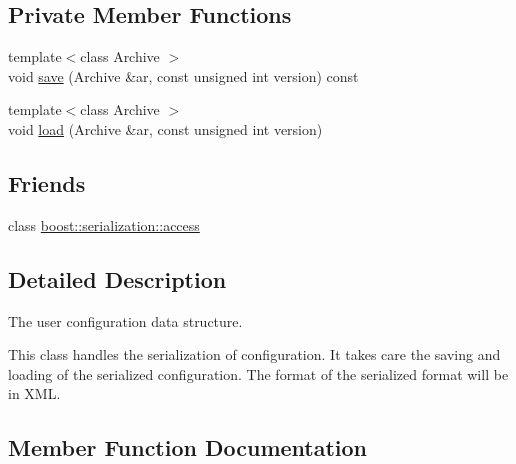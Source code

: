 \subsection*{Private Member Functions}
\begin{DoxyCompactItemize}
\item 
{\footnotesize template$<$class Archive $>$ }\\void \hyperlink{class_do_lah_1_1_configuration_a7d9dff9a6b5162f5fabf5bb657962b13}{save} (Archive \&ar, const unsigned int version) const 
\item 
{\footnotesize template$<$class Archive $>$ }\\void \hyperlink{class_do_lah_1_1_configuration_adeb5727cd5d0327788622eee67bc3c6a}{load} (Archive \&ar, const unsigned int version)
\end{DoxyCompactItemize}
\subsection*{Friends}
\begin{DoxyCompactItemize}
\item 
class \hyperlink{class_do_lah_1_1_configuration_ac98d07dd8f7b70e16ccb9a01abf56b9c}{boost\+::serialization\+::access}
\end{DoxyCompactItemize}


\subsection{Detailed Description}
The user configuration data structure. 

This class handles the serialization of configuration. It takes care the saving and loading of the serialized configuration. The format of the serialized format will be in X\+M\+L. 

\subsection{Member Function Documentation}
\hypertarget{class_do_lah_1_1_configuration_adeb5727cd5d0327788622eee67bc3c6a}{}
